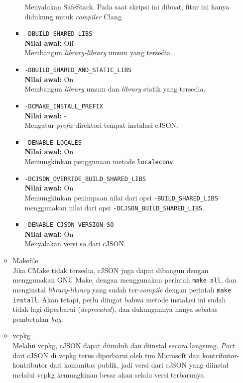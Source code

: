\documentclass[a4paper,twoside]{article}
\begin{document}
\begin{enumerate}
\begin{itemize}
\begin{itemize}
		Menyalakan SafeStack. Pada saat skripsi ini dibuat, fitur ini hanya didukung untuk \textit{compiler} Clang.
		\item \verb|-DBUILD_SHARED_LIBS|\\
		\textbf{Nilai awal:} Off\\
		Membangun \textit{library-library} umum yang tersedia.
		\item \verb|-DBUILD_SHARED_AND_STATIC_LIBS|\\
		\textbf{Nilai awal:} On\\
		Membangun \textit{library} umum dan \textit{library} statik yang tersedia.
		\item \verb|-DCMAKE_INSTALL_PREFIX|\\
		\textbf{Nilai awal:} -\\
		Mengatur \textit{prefix} direktori tempat instalasi cJSON.
		\item \verb|-DENABLE_LOCALES|\\
		\textbf{Nilai awal:} On\\
		Memungkinkan penggunaan metode \verb|localeconv|.
		\item \verb|-DCJSON_OVERRIDE_BUILD_SHARED_LIBS|\\
		\textbf{Nilai awal:} On\\
		Memungkinkan penimpaan nilai dari opsi \verb|-BUILD_SHARED_LIBS| menggunakan nilai dari opsi \verb|-DCJSON_BUILD_SHARED_LIBS|.
		\item \verb|-DENABLE_CJSON_VERSION_SO|\\
		\textbf{Nilai awal:} On\\
		Menyalakan versi so dari cJSON.
	\end{itemize}

	\item Makefile\\
	Jika CMake tidak tersedia, cJSON juga dapat dibangun dengan menggunakan GNU Make, dengan menggunakan perintah \verb|make all|, dan menginstal \textit{library-library} yang sudah ter-\textit{compile} dengan perintah \verb|make install|. Akan tetapi, perlu diingat bahwa metode instalasi ini sudah tidak lagi diperbarui (\textit{deprecated}), dan dukungannya hanya sebatas pembetulan \textit{bug}.
	
	\item vcpkg\\
	Melalui vcpkg, cJSON dapat diunduh dan diinstal secara langsung. \textit{Port} dari cJSON di vcpkg terus diperbarui oleh tim Microsoft dan kontributor-kontributor dari komunitas publik, jadi versi dari cJSON yang diinstal melalui vcpkg kemungkinan besar akan selalu versi terbarunya.
\end{itemize}


\end{enumerate}
\end{document}
